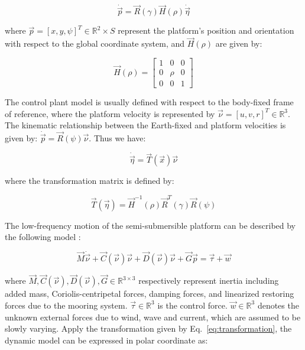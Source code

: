 \begin{sloppypar}
\begin{equation}
\dot{\vec{p}} = \vec{R}(\gamma)\vec{H}(\rho)\dot{\vec{\eta}}
\end{equation}

\noindent where $\vec{p} = [x, y, \psi]^T \in \mathbb{R}^2\times S$ represent the platform's position and orientation with respect to the global coordinate system, and $\vec{H}(\rho)$ are given by:

\begin{equation}
	\vec{H}(\rho) = 
	\begin{bmatrix}
		1 & 0 & 0 \\
		0 & \rho & 0 \\
		0 & 0 & 1
	\end{bmatrix}
\end{equation}

The control plant model is usually defined with respect to the body-fixed frame of reference, where the platform velocity is represented by $\vec{\nu} = [u, v, r]^T \in \mathbb{R}^3$. The kinematic relationship between the Earth-fixed and platform velocities is given by: $\dot{\vec{p}} = \vec{R}(\psi)\vec{\nu}$. Thus we have:

\begin{equation} \label{eq:transformation}
\dot{\vec{\eta}} = \vec{T}(\vec{x})\vec{\nu}
\end{equation} 

\noindent where the transformation matrix is defined by:

\begin{equation}
\vec{T}(\vec{\eta}) = \vec{H}^{-1}(\rho)\vec{R}^T(\gamma)\vec{R}(\psi)
\end{equation}

The low-frequency motion of the semi-submersible platform can be described by the following model \cite{fossen2011handbook}:

\begin{equation}
\vec{M}\dot{\vec{\nu}} + \vec{C}(\vec{\nu})\vec{\nu} + \vec{D}(\vec{\nu})\vec{\nu} + \vec{G}\vec{p} = \vec{\tau} + \vec{w}
\end{equation}

\noindent where $\vec{M}, \vec{C}(\vec{\nu}), \vec{D}(\vec{\nu}), \vec{G}\in\mathbb{R}^{3\times3}$ respectively represent inertia including added mass, Coriolis-centripetal forces, damping forces, and linearized restoring forces due to the mooring system. $\vec{\tau}\in\mathbb{R}^3$ is the control force. $\vec{w}\in\mathbb{R}^3$ denotes the unknown external forces due to wind, wave and current, which are assumed to be slowly varying. Apply the transformation given by Eq.~\ref{eq:transformation}, the dynamic model can be expressed in polar coordinate as:


\end{sloppypar}
